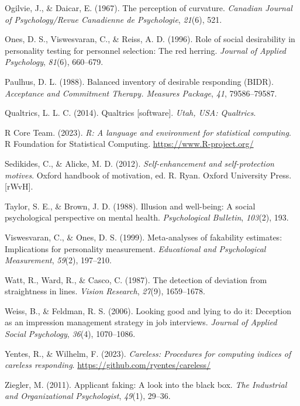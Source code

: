 \documentclass[
  ,jou]{apa6}
\newlength{\cslhangindent}
\newlength{\cslentryspacingunit} %
\newenvironment{CSLReferences}[2] %
 {%
  \setlength{\parindent}{0pt}
  \ifodd #1
  \let\oldpar\par
  \def\par{\hangindent=\cslhangindent\oldpar}
  \fi
  \setlength{\parskip}{#2\cslentryspacingunit}
 }%
 {}
\begin{document}
\begin{CSLReferences}{1}{0}
\leavevmode{}%
Ogilvie, J., \& Daicar, E. (1967). The perception of curvature. \emph{Canadian Journal of Psychology/Revue Canadienne de Psychologie}, \emph{21}(6), 521.

\leavevmode{}%
Ones, D. S., Viswesvaran, C., \& Reiss, A. D. (1996). Role of social desirability in personality testing for personnel selection: The red herring. \emph{Journal of Applied Psychology}, \emph{81}(6), 660--679.

\leavevmode{}%
Paulhus, D. L. (1988). Balanced inventory of desirable responding ({BIDR}). \emph{Acceptance and Commitment Therapy. Measures Package}, \emph{41}, 79586--79587.

\leavevmode{}%
Qualtrics, L. L. C. (2014). Qualtrics {[}software{]}. \emph{Utah, {USA}: Qualtrics}.

\leavevmode{}%
R Core Team. (2023). \emph{R: A language and environment for statistical computing}. R Foundation for Statistical Computing. \url{https://www.R-project.org/}

\leavevmode{}%
Sedikides, C., \& Alicke, M. D. (2012). \emph{Self-enhancement and self-protection motives}. Oxford handbook of motivation, ed. R. Ryan. Oxford University Press.{[}{rWvH}{]}.

\leavevmode{}%
Taylor, S. E., \& Brown, J. D. (1988). Illusion and well-being: A social psychological perspective on mental health. \emph{Psychological Bulletin}, \emph{103}(2), 193.

\leavevmode{}%
Viswesvaran, C., \& Ones, D. S. (1999). Meta-analyses of fakability estimates: Implications for personality measurement. \emph{Educational and Psychological Measurement}, \emph{59}(2), 197--210.

\leavevmode{}%
Watt, R., Ward, R., \& Casco, C. (1987). The detection of deviation from straightness in lines. \emph{Vision Research}, \emph{27}(9), 1659--1678.

\leavevmode{}%
Weiss, B., \& Feldman, R. S. (2006). Looking good and lying to do it: Deception as an impression management strategy in job interviews. \emph{Journal of Applied Social Psychology}, \emph{36}(4), 1070--1086.

\leavevmode{}%
Yentes, R., \& Wilhelm, F. (2023). \emph{Careless: Procedures for computing indices of careless responding}. \url{https://github.com/ryentes/careless/}

\leavevmode{}%
Ziegler, M. (2011). Applicant faking: A look into the black box. \emph{The Industrial and Organizational Psychologist}, \emph{49}(1), 29--36.

\end{CSLReferences}
\end{document}
